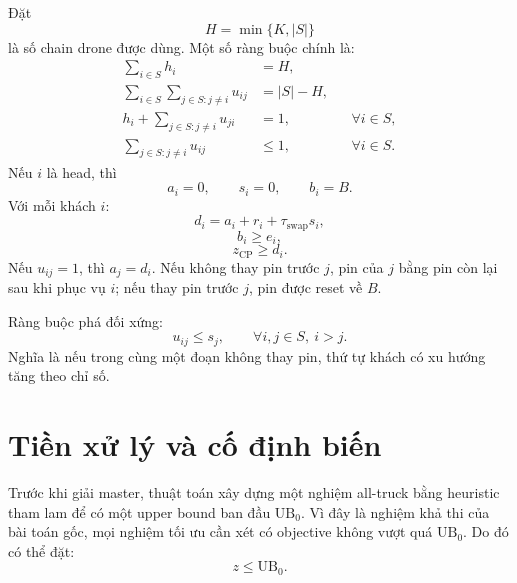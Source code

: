 \documentclass[12pt,a4paper]{article}
\newcommand{\UB}{\mathrm{UB}}
\begin{document}
Đặt
\[
    H=\min\{K,|S|\}
\]
là số chain drone được dùng. Một số ràng buộc chính là:
\begin{align}
    \sum_{i\in S}h_i &= H, \label{eq:cp-heads}\\
    \sum_{i\in S}\sum_{j\in S:j\neq i}u_{ij} &= |S|-H, \label{eq:cp-arcs}\\
    h_i+\sum_{j\in S:j\neq i}u_{ji} &= 1, && \forall i\in S, \label{eq:cp-in}\\
    \sum_{j\in S:j\neq i}u_{ij} &\le 1, && \forall i\in S. \label{eq:cp-out}
\end{align}
Nếu $i$ là head, thì
\begin{equation}
    a_i=0,\qquad s_i=0,\qquad b_i=B.
    \label{eq:cp-head-prop}
\end{equation}
Với mỗi khách $i$:
\begin{equation}
    d_i=a_i+r_i+\tau_{\mathrm{swap}}s_i,
    \label{eq:cp-duration}
\end{equation}
\begin{equation}
    b_i\ge e_i,
    \label{eq:cp-battery-enough}
\end{equation}
\begin{equation}
    z_{\mathrm{CP}}\ge d_i.
    \label{eq:cp-makespan}
\end{equation}
Nếu $u_{ij}=1$, thì $a_j=d_i$. Nếu không thay pin trước $j$, pin của $j$ bằng pin còn lại sau khi phục vụ $i$; nếu thay pin trước $j$, pin được reset về $B$.

Ràng buộc phá đối xứng:
\begin{equation}
    u_{ij}\le s_j,\qquad \forall i,j\in S,\ i>j.
    \label{eq:cp-symmetry}
\end{equation}
Nghĩa là nếu trong cùng một đoạn không thay pin, thứ tự khách có xu hướng tăng theo chỉ số.

\section{Tiền xử lý và cố định biến}
\label{sec:preprocess}

Trước khi giải master, thuật toán xây dựng một nghiệm all-truck bằng heuristic tham lam để có một upper bound ban đầu $\UB_{0}$. Vì đây là nghiệm khả thi của bài toán gốc, mọi nghiệm tối ưu cần xét có objective không vượt quá $\UB_0$. Do đó có thể đặt:
\begin{equation}
    z\le \UB_0.
    \label{eq:z-ub}
\end{equation}
\end{document}
